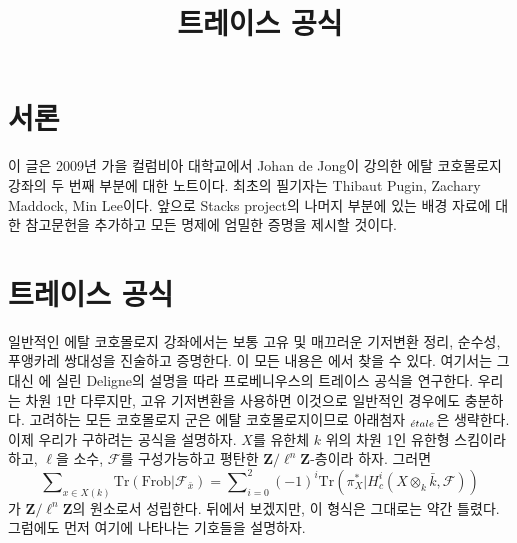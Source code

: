 

%


\title{트레이스 공식}


\maketitle

\label{section-phantom}

\tableofcontents


\section{서론}
\label{section-introduction}

\noindent
이 글은 2009년 가을 컬럼비아 대학교에서 Johan de Jong이 강의한
에탈 코호몰로지 강좌의 두 번째 부분에 대한 노트이다. 최초의 필기자는
Thibaut Pugin, Zachary Maddock, Min Lee이다. 앞으로 Stacks project의
나머지 부분에 있는 배경 자료에 대한 참고문헌을 추가하고 모든 명제에
엄밀한 증명을 제시할 것이다.









\section{트레이스 공식}
\label{section-trace-formula}

\noindent
일반적인 에탈 코호몰로지 강좌에서는 보통 고유 및 매끄러운 기저변환
정리, 순수성, 푸앵카레 쌍대성을 진술하고 증명한다. 이 모든 내용은
\cite[Arcata]{SGA4.5}에서 찾을 수 있다. 여기서는 그 대신
\cite[Rapport]{SGA4.5}에 실린 Deligne의 설명을 따라 프로베니우스의
트레이스 공식을 연구한다. 우리는 차원 1만 다루지만, 고유 기저변환을
사용하면 이것으로 일반적인 경우에도 충분하다. 고려하는 모든 코호몰로지
군은 에탈 코호몰로지이므로 아래첨자 $_{\acute{e}tale}$은 생략한다. 이제 우리가
구하려는 공식을 설명하자. $X$를 유한체 $k$ 위의 차원 1인 유한형
스킴이라 하고, $\ell$을 소수, $\mathcal{F}$를 구성가능하고 평탄한
$\mathbf{Z}/\ell^n\mathbf{Z}$-층이라 하자. 그러면
\begin{equation}
\label{equation-trace-formula-initial}
\sum\nolimits_{x \in X(k)}
\text{Tr}(\text{Frob} | \mathcal{F}_{\bar x}) =
\sum\nolimits_{i = 0}^2
(-1)^i \text{Tr}(\pi_X^* | H^i_c(X \otimes_k \bar k, \mathcal{F}))
\end{equation}
가 $\mathbf{Z}/\ell^n\mathbf{Z}$의 원소로서 성립한다. 뒤에서 보겠지만,
이 형식은 그대로는 약간 틀렸다. 그럼에도 먼저 여기에 나타나는 기호들을
설명하자.





